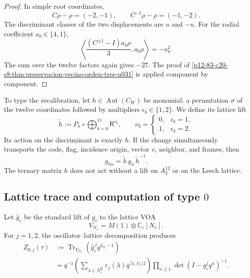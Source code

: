 \begin{proof}
In simple root coordinates,
\[
 C\rho-\rho=(-2,-1),
 \qquad
 C^{-1}\rho-\rho=(-1,-2).
\]
The discriminant classes of the two displacements are \(u\) and \(-u\).
For the radial coefficient \(a_b\in\{4,1\}\),
\[
 \left\langle
 \frac{(C^{\pm1}-I)a_b\rho}{3},a_b\rho
 \right\rangle=-a_b^2.
\]
The sum over the twelve factors again gives \(-27\). The proof of
\cref{p12-83-c20-s8:thm:preservacion-vecino-orden-tres-u031} is applied component by
component.
\end{proof}

To type the recalibration, let
\(h\in\operatorname{Aut}(C_W)\) be monomial: a permutation \(\sigma\) of
the twelve coordinates followed by multipliers
\(\epsilon_b\in\{1,2\}\). We define its lattice lift
\begin{equation}
 \widetilde h
 :=P_\sigma\circ
 \bigoplus_{b=0}^{11}\mathsf R^{\nu_b},
 \qquad
 \nu_b=
 \begin{cases}
 0,&\epsilon_b=1,\\
 1,&\epsilon_b=2.
 \end{cases}
 \label{p12-83-c20-s8:eq:elevacion-monomial-u031}
\end{equation}
Its action on the discriminant is exactly \(h\). If the change simultaneously
transports the code, flag, incidence origin, vector \(v\), neighbor, and
frames, then
\begin{equation}
 g_{hu}=\widetilde h\,g_u\,\widetilde h^{-1}.
 \label{p12-83-c20-s8:eq:naturalidad-isometrias-u031}
\end{equation}
The ternary matrix \(h\) does not act without a lift on \(A_2^{12}\) or on
the Leech lattice.

\subsection{Lattice trace and computation of type \(0\)}

Let \(\widehat g_c\) be the standard lift of \(g_c\) to the lattice VOA
\[
 V_{N_v}=M(1)\otimes\mathbb C_\varepsilon[N_v].
\]
For \(j=1,2\), the oscillator--lattice decomposition produces
\begin{equation}
 \begin{split}
 Z_{0,j}(\tau)
 &:=
 \operatorname{Tr}_{V_{N_v}}
 \left(\widehat g_c^{\,j}q^{L_0-1}\right)\\
 &=q^{-1}
 \left(
 \sum_{\lambda\in N_v^{g_c^j}}
 \varepsilon_j(\lambda)
 q^{\langle\lambda,\lambda\rangle/2}
 \right)
 \prod_{n\ge1}\det(I-g_c^jq^n)^{-1}.
 \end{split}
 \label{p12-83-c20-s8:eq:factorizacion-traza-reticular-u031}
\end{equation}

